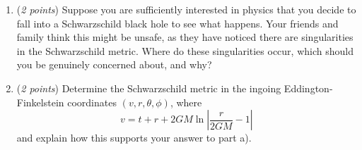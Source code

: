 \documentclass[12pt]{article}
\newcommand{\be}{\begin{equation}}
\newcommand{\ee}{\end{equation}}
\begin{document}
\begin{enumerate}[label=\alph*)]
\item (\emph{2 points}) Suppose you are sufficiently interested in physics that you decide to fall into a Schwarzschild black hole to see what happens. 
Your friends and family think this might be unsafe, as they have noticed there are singularities in the Schwarzschild metric. 
Where do these singularities occur, which should you be genuinely concerned about, and why? 
\item (\emph{2 points}) Determine the Schwarzschild metric in the ingoing Eddington-Finkelstein coordinates $(v,r,\theta,\phi)$, where
\be
v = t + r + 2GM \ln\left| \frac{r}{2GM} - 1 \right|
\ee
and explain how this supports your answer to part a). 
\end{enumerate}
\end{document}
